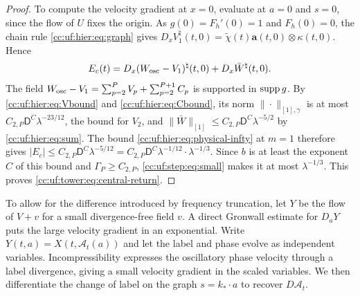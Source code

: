 \begin{proof}
To compute the velocity gradient at $x=0$, evaluate at $a=0$ and $s=0$,
since the flow of $U$ fixes the origin. As
\(g(0)=F_h'(0)=1\) and \(F_h(0)=0\), the chain rule
\eqref{cc:uf:hier:eq:graph} gives
\(D_xV_1^\natural(t,0)=\widetilde\chi(t)\mathbf a(t,0)\otimes\kappa(t,0)\).
Hence
\[
 E_c(t)=D_x(W_{\rm osc}-V_1)^\natural(t,0)+D_x\bar W^\natural(t,0).
\]
The field \(W_{\rm osc}-V_1=\sum_{p=2}^PV_p+\sum_{p=2}^{P+1}C_p\) is supported in
\(\operatorname{supp} g\). By \eqref{cc:uf:hier:eq:Vbound} and
\eqref{cc:uf:hier:eq:Cbound}, its norm \(\|\cdot\|_{[1],\gamma}\) is at
most \(C_{2,P}\mathsf D^C\lambda^{-23/12}\), the bound for $V_2$,
and \(\|\bar W\|_{[1]}\le C_{2,P}\mathsf D^C\lambda^{-5/2}\) by
\eqref{cc:uf:hier:eq:sum}. The bound \eqref{cc:uf:hier:eq:physical-infty}
at \(m=1\) therefore gives
\(|E_c|\le C_{2,P}\mathsf D^C\lambda^{-5/12}
=C_{2,P}\mathsf D^C\lambda^{-1/12}\cdot\lambda^{-1/3}\). Since
$b$ is at least the exponent $C$ of this bound and
$\Gamma_P\ge C_{2,P}$, \eqref{cc:uf:step:eq:small} makes it at
most $\lambda^{-1/3}$.
This proves \eqref{cc:uf:tower:eq:central-return}.
\end{proof}

To allow for the difference introduced by frequency truncation, let $Y$
be the flow of $V+v$ for a small divergence-free field $v$. A direct Gronwall
estimate for $D_aY$ puts the large velocity gradient in an exponential.
Write $Y(t,a)=X(t,\mathcal A_t(a))$ and let the label and phase evolve
as independent variables. Incompressibility expresses the oscillatory
phase velocity through a label divergence, giving a small velocity
gradient in the scaled variables. We then differentiate the change of
label on the graph $s=k_*\cdot a$ to recover $D\mathcal A_t$.

